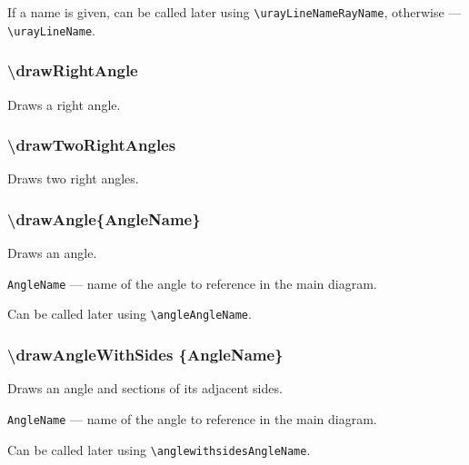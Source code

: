 \documentclass{ltxdoc}
\begin{document}
	If a name is given, can be called later using \texttt{\textbackslash urayLineNameRayName}, otherwise — \texttt{\textbackslash urayLineName}. 



	




\subsubsection{\textbackslash drawRightAngle}

	Draws a right angle.

\subsubsection{\textbackslash drawTwoRightAngles}

	Draws two right angles.


\subsubsection{\textbackslash drawAngle\{AngleName\}}

	Draws an angle.

	\texttt{AngleName} — name of the angle to reference in the main diagram. 
	
	Can be called later using \texttt{\textbackslash angleAngleName}.
	
\subsubsection{\textbackslash drawAngleWithSides \{AngleName\}}

	Draws an angle and sections of its adjacent sides.

	\texttt{AngleName} — name of the angle to reference in the main diagram. 
	
	Can be called later using \texttt{\textbackslash anglewithsidesAngleName}.
	
\end{document}
